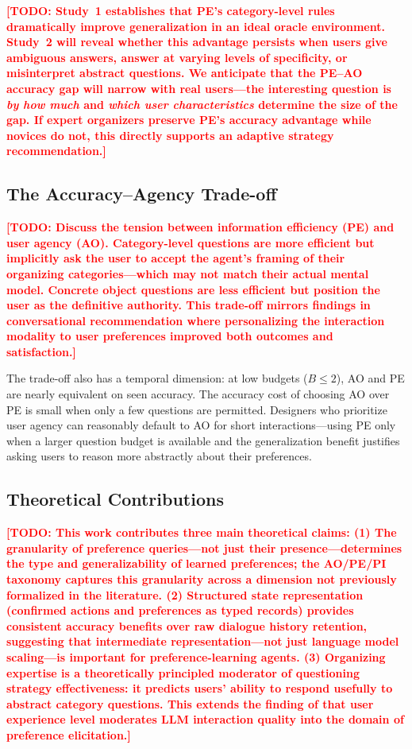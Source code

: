 \documentclass[a4paper,fleqn]{cas-sc}
\newcommand{\TODO}[1]{\textcolor{red}{\textbf{[TODO: #1]}}}
\begin{document}
\TODO{Study~1 establishes that PE's category-level rules dramatically improve generalization in an ideal oracle environment. Study~2 will reveal whether this advantage persists when users give ambiguous answers, answer at varying levels of specificity, or misinterpret abstract questions. We anticipate that the PE--AO accuracy gap will narrow with real users---the interesting question is \emph{by how much} and \emph{which user characteristics} determine the size of the gap. If expert organizers preserve PE's accuracy advantage while novices do not, this directly supports an adaptive strategy recommendation.}

\subsection{The Accuracy--Agency Trade-off}

\TODO{Discuss the tension between information efficiency (PE) and user agency (AO). Category-level questions are more efficient but implicitly ask the user to accept the agent's framing of their organizing categories---which may not match their actual mental model. Concrete object questions are less efficient but position the user as the definitive authority. This trade-off mirrors findings in conversational recommendation \citep{shin2025toward} where personalizing the interaction modality to user preferences improved both outcomes and satisfaction.}

The trade-off also has a temporal dimension: at low budgets ($B \leq 2$), AO and PE are nearly equivalent on seen accuracy. The accuracy cost of choosing AO over PE is small when only a few questions are permitted. Designers who prioritize user agency can reasonably default to AO for short interactions---using PE only when a larger question budget is available and the generalization benefit justifies asking users to reason more abstractly about their preferences.

\subsection{Theoretical Contributions}

\TODO{This work contributes three main theoretical claims:
(1) The granularity of preference queries---not just their presence---determines the type and generalizability of learned preferences; the AO/PE/PI taxonomy captures this granularity across a dimension not previously formalized in the literature.
(2) Structured state representation (confirmed actions and preferences as typed records) provides consistent accuracy benefits over raw dialogue history retention, suggesting that intermediate representation---not just language model scaling---is important for preference-learning agents.
(3) Organizing expertise is a theoretically principled moderator of questioning strategy effectiveness: it predicts users' ability to respond usefully to abstract category questions. This extends the finding of \citet{skjuve2025chatgpt} that user experience level moderates LLM interaction quality into the domain of preference elicitation.}
\end{document}

